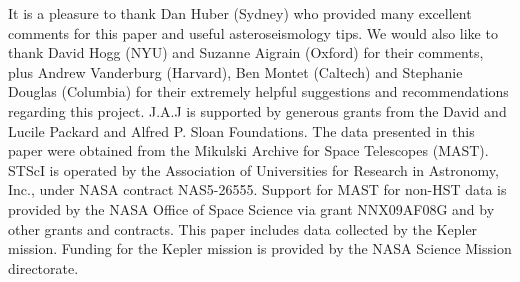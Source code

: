 It is a pleasure to thank Dan Huber (Sydney) who provided many excellent
comments for this paper and useful asteroseismology tips.
We would also like to thank David Hogg (NYU) and Suzanne Aigrain (Oxford)
for their comments, plus Andrew Vanderburg (Harvard), Ben Montet (Caltech)
and Stephanie Douglas (Columbia) for their extremely helpful suggestions and recommendations regarding this project.
J.A.J is supported by generous grants from the David and Lucile Packard and
Alfred P. Sloan Foundations.
The data presented in this paper were obtained from the Mikulski Archive for
Space Telescopes (MAST).
STScI is operated by the Association of Universities for Research in Astronomy,
Inc., under NASA contract NAS5-26555.
Support for MAST for non-HST data is provided by the NASA Office of Space
Science via grant NNX09AF08G and by other grants and contracts.
This paper includes data collected by the Kepler mission.
Funding for the Kepler mission is provided by the NASA Science Mission
directorate.

% 
% 
% 
